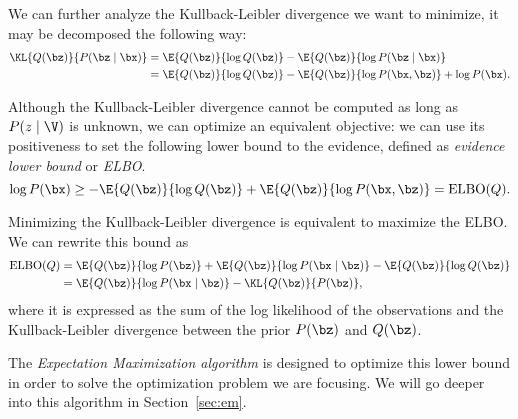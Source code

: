 We can further analyze the Kullback-Leibler divergence we want to minimize, it may be decomposed the following way:
\[
  \begin{aligned}
    \KL{Q(\bz)}{P(\bz \mid \bx)} &= \E{Q(\bz)}{\log{Q(\bz)}} - \E{Q(\bz)}{\log{P(\bz \mid \bx)}}\\
    &= \E{Q(\bz)}{\log{Q(\bz)}} - \E{Q(\bz)}{\log{P(\bx, \bz)}} + \log{P(\bx)}.
  \end{aligned}
\]

Although the Kullback-Leibler divergence cannot be computed as long as \(P(z \mid \V)\) is unknown, we can optimize an equivalent objective: we can use its positiveness to set the following lower bound to the evidence, defined as \emph{evidence lower bound} or \emph{ELBO}.
\[
  \log{P(\bx)} \geq  - \E{Q(\bz)}{\log{Q(\bz)}} + \E{Q(\bz)}{\log{P(\bx, \bz)}}  = \text{ELBO}(Q).
\]

Minimizing the Kullback-Leibler divergence is equivalent to maximize the ELBO. We can rewrite this bound as
\[
  \begin{aligned}
    \text{ELBO}(Q) &= \E{Q(\bz)}{\log{P(\bz)}} + \E{Q(\bz)}{\log{P(\bx \mid \bz)}} - \E{Q(\bz)}{\log{Q(\bz)}}\\
    &= \E{Q(\bz)}{\log{P(\bx \mid \bz)}} - \KL{Q(\bz)}{P(\bz)},
  \end{aligned}
\]
where it is expressed as the sum of the log likelihood of the observations and the Kullback-Leibler divergence between the prior \(P(\bz)\) and \(Q(\bz)\).

The \emph{Expectation Maximization algorithm} is designed to optimize this lower bound in order to solve the optimization problem we are focusing. We will go deeper into this algorithm in Section~\ref{sec:em}.

